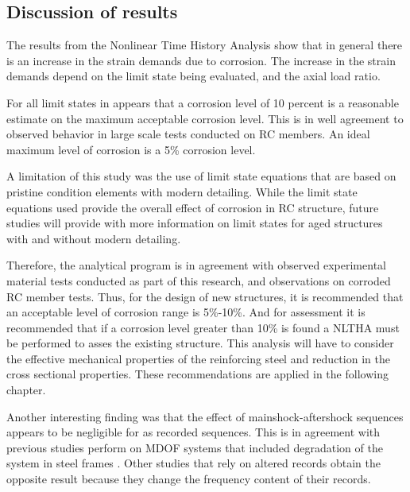 \subsection{Discussion of results}

The results from the Nonlinear Time History Analysis show that in general there is an increase in the strain demands due to corrosion. The increase in the strain demands depend on the limit state being evaluated, and the axial load ratio. 

For all limit states in appears that a corrosion level of 10 percent is a reasonable estimate on the maximum acceptable corrosion level. This is in well agreement to observed behavior in large scale tests conducted on RC members. An ideal maximum level of corrosion is a 5\% corrosion level.

A limitation of this study was the use of limit state equations that are based on pristine condition elements with modern detailing. While the limit state equations used provide the overall effect of corrosion in RC structure, future studies will provide with more information on limit states for aged structures with and without modern detailing.

Therefore, the analytical program is in agreement with observed experimental material tests conducted as part of this research, and observations on corroded RC member tests. Thus, for the design of new structures, it is recommended that an acceptable level of corrosion range is 5\%-10\%. And for assessment it is recommended that if a corrosion level greater than 10\% is found a NLTHA must be performed to asses the existing structure. This analysis will have to consider the effective mechanical properties of the reinforcing steel and reduction in the cross sectional properties. These recommendations are applied in the following chapter. 

Another interesting finding was that the effect of mainshock-aftershock sequences appears to be negligible for as recorded sequences. This is in agreement with previous studies perform on MDOF systems that included degradation of the system in steel frames \cite{Ruiz-Garcia2011}. Other studies that rely on altered records obtain the opposite result because they change the frequency content of their records.